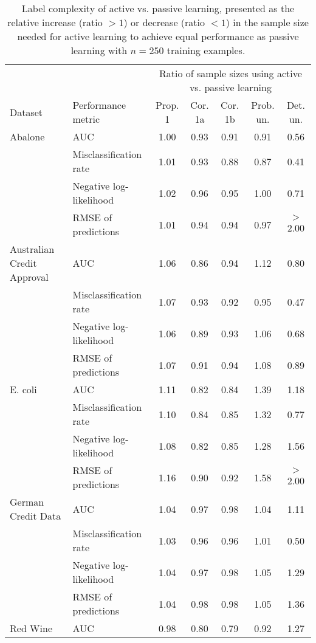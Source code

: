\begin{table*}[ht]
\centering
\caption{Label complexity of active vs. passive learning, presented as the relative increase (ratio $>1$) or decrease (ratio $<1$) in the sample size needed for active learning to achieve equal performance as passive learning with $n = 250$ training examples.} 
\label{tab:label_complexity}
\begin{tabular}{llccccc}
  \multicolumn{2}{c}{ } & \multicolumn{5}{c}{Ratio of sample sizes using active vs. passive learning} \\ \cmidrule(lr){3-7}Dataset & Performance metric & Prop. 1 & Cor. 1a & Cor. 1b & Prob. un. & Det. un. \\ 
  \hline
Abalone & AUC & 1.00 & 0.93 & 0.91 & 0.91 & 0.56 \\ 
   & Misclassification rate & 1.01 & 0.93 & 0.88 & 0.87 & 0.41 \\ 
   & Negative log-likelihood & 1.02 & 0.96 & 0.95 & 1.00 & 0.71 \\ 
   & RMSE of predictions & 1.01 & 0.94 & 0.94 & 0.97 & $>$2.00 \\ 
   \hline
Australian Credit Approval & AUC & 1.06 & 0.86 & 0.94 & 1.12 & 0.80 \\ 
   & Misclassification rate & 1.07 & 0.93 & 0.92 & 0.95 & 0.47 \\ 
   & Negative log-likelihood & 1.06 & 0.89 & 0.93 & 1.06 & 0.68 \\ 
   & RMSE of predictions & 1.07 & 0.91 & 0.94 & 1.08 & 0.89 \\ 
   \hline
E. coli & AUC & 1.11 & 0.82 & 0.84 & 1.39 & 1.18 \\ 
   & Misclassification rate & 1.10 & 0.84 & 0.85 & 1.32 & 0.77 \\ 
   & Negative log-likelihood & 1.08 & 0.82 & 0.85 & 1.28 & 1.56 \\ 
   & RMSE of predictions & 1.16 & 0.90 & 0.92 & 1.58 & $>$2.00 \\ 
   \hline
German Credit Data & AUC & 1.04 & 0.97 & 0.98 & 1.04 & 1.11 \\ 
   & Misclassification rate & 1.03 & 0.96 & 0.96 & 1.01 & 0.50 \\ 
   & Negative log-likelihood & 1.04 & 0.97 & 0.98 & 1.05 & 1.29 \\ 
   & RMSE of predictions & 1.04 & 0.98 & 0.98 & 1.05 & 1.36 \\ 
   \hline
Red Wine & AUC & 0.98 & 0.80 & 0.79 & 0.92 & 1.27 \\ 

\end{tabular}
\end{table*}
